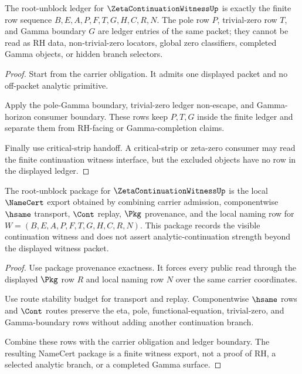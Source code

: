 \begin{theorem}
\label{thm:zeta-continuation-witness-ledger-boundary}
The root-unblock ledger for $\ZetaContinuationWitnessUp$ is exactly the finite row sequence $B,E,A,P,F,T,G,H,C,R,N$. The pole row $P$, trivial-zero row $T$, and Gamma boundary $G$ are ledger entries of the same packet; they cannot be read as RH data, non-trivial-zero locators, global zero classifiers, completed Gamma objects, or hidden branch selectors.
\end{theorem}
\begin{proof}
Start from the carrier obligation. It admits one displayed packet and no off-packet analytic primitive.

Apply the pole-Gamma boundary, trivial-zero ledger non-escape, and Gamma-horizon consumer boundary. These rows keep $P,T,G$ inside the finite ledger and separate them from RH-facing or Gamma-completion claims.

Finally use critical-strip handoff. A critical-strip or zeta-zero consumer may read the finite continuation witness interface, but the excluded objects have no row in the displayed ledger.
\end{proof}

\begin{theorem}
\label{thm:zeta-continuation-witness-namecert-package}
The root-unblock package for $\ZetaContinuationWitnessUp$ is the local $\NameCert$ export obtained by combining carrier admission, componentwise $\hsame$ transport, $\Cont$ replay, $\Pkg$ provenance, and the local naming row for $W=(B,E,A,P,F,T,G,H,C,R,N)$. This package records the visible continuation witness and does not assert analytic-continuation strength beyond the displayed witness packet.
\end{theorem}
\begin{proof}
Use package provenance exactness. It forces every public read through the displayed $\Pkg$ row $R$ and local naming row $N$ over the same carrier coordinates.

Use route stability budget for transport and replay. Componentwise $\hsame$ rows and $\Cont$ routes preserve the eta, pole, functional-equation, trivial-zero, and Gamma-boundary rows without adding another continuation branch.

Combine these rows with the carrier obligation and ledger boundary. The resulting NameCert package is a finite witness export, not a proof of RH, a selected analytic branch, or a completed Gamma surface.
\end{proof}

